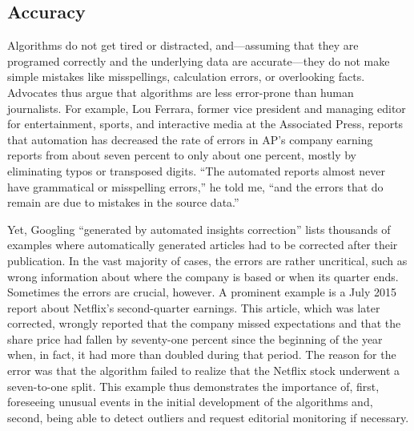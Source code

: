\documentclass[notoc, symmetric, nobib, nols]{towcenter-guideto-book}
\begin{document}
\subsection{Accuracy}

Algorithms do not get tired or distracted, and---assuming that they are programed correctly and the underlying data are accurate---they do not make simple mistakes like misspellings, calculation errors, or overlooking facts. Advocates thus argue that algorithms are less error-prone than human journalists. For example, Lou Ferrara, former vice president and managing editor for entertainment, sports, and interactive media at the Associated Press, reports that automation has decreased the rate of errors in AP's company earning reports from about seven percent to only about one percent, mostly by eliminating typos or transposed digits. ``The automated reports almost never have grammatical or misspelling errors,'' he told me, ``and the errors that do remain are due to mistakes in the source data.''

Yet, Googling ``generated by automated insights correction'' lists thousands of examples where automatically generated articles had to be corrected after their publication.\autocite{diak15} In the vast majority of cases, the errors are rather uncritical, such as wrong information about where the company is based or when its quarter ends. Sometimes the errors are crucial, however. A prominent example is a July 2015 report about Netflix's second-quarter earnings.\autocite{ap15-2} This article, which was later corrected, wrongly reported that the company missed expectations and that the share price had fallen by seventy-one percent since the beginning of the year when, in fact, it had more than doubled during that period. The reason for the error was that the algorithm failed to realize that the Netflix stock underwent a seven-to-one split. This example thus demonstrates the importance of, first, foreseeing unusual events in the initial development of the algorithms and, second, being able to detect outliers and request editorial monitoring if necessary.\autocite{leco15}
\end{document}
